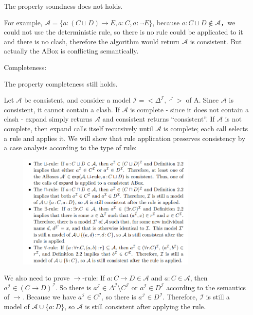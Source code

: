 \documentclass[12pt]{article}
\begin{document}
\begin{enumerate}
        The property soundness does not holds. \par
        For example, $\mathcal{A} = \{ a: (C \sqcup D) \to E, a: C,a: \lnot E  \}$, because $a: C \sqcup D \not \in \mathcal{A}$，we could not use the deterministic rule, so there is no rule could be applicated to it and there is no clash, therefore the algorithm would return $\mathcal{A}$ is consistent. But actually the ABox is conflicting semantically.\par
        Completeness: \par
        The property completeness still holds. \par
        Let $\mathcal{A}$ be consistent, and consider a model $\mathcal{I} = <\Delta^{\mathcal{I}}, \cdot^{\mathcal{I}}>$ of A.
Since $\mathcal{A}$ is consistent, it cannot contain a clash.
If $\mathcal{A}$ is complete - since it does not contain a clash - expand simply
returns $\mathcal{A}$ and consistent returns “consistent”. If $\mathcal{A}$ is not complete, then
expand calls itself recursively until $\mathcal{A}$ is complete; each call selects a rule
and applies it. We will show that rule application preserves consistency
by a case analysis according to the type of rule:
\begin{figure}[htbp]
    \centering
    \includegraphics[width=0.8\textwidth,height=0.5\textwidth]{hw9.png}
\end{figure}  \par
We also need to prove $\rightarrow$-rule: If $a: C \to D \in \mathcal{A}$ and $a: C \in \mathcal{A}$, then $a^{\mathcal{I}} \in (C \to D)^{\mathcal{I}}$. So there is $a^{\mathcal{I}} \in \Delta^{\mathcal{I}} \setminus C^{\mathcal{I}}$ or $a^{\mathcal{I}} \in D^{\mathcal{I}}$ according to the semantics of $\to$. Because we have $a^{\mathcal{I}} \in C^{\mathcal{I}}$, so there is $a^{\mathcal{I}} \in D^{\mathcal{I}}$. Therefore, $\mathcal{I}$ is still a model of $\mathcal{A} \cup \{ a: D \}$, so $\mathcal{A}$ is still consistent after applying the rule. \par 

\end{enumerate}
\end{document}
